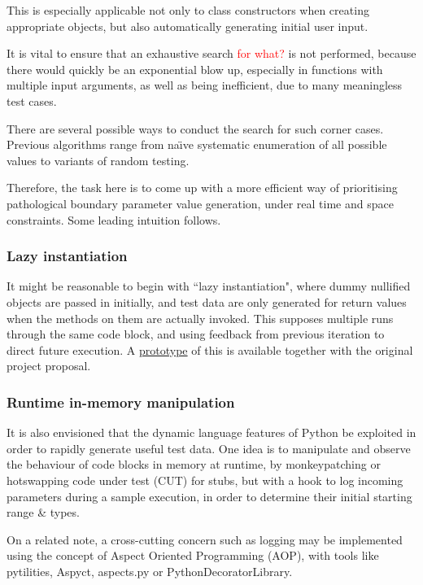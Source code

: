 \documentclass{icldt}
\numberwithin{equation}{section}       %
\def\naive{na\"{\i}ve }
\begin{document}
This is especially applicable not only to class constructors when creating appropriate objects, but also automatically generating initial user input.

It is vital to ensure that an exhaustive search \textcolor{red}{for what?} is not performed, because there would quickly be an exponential blow up, especially in functions with multiple input arguments, as well as being inefficient, due to many meaningless test cases.

There are several possible ways to conduct the search for such corner cases. Previous algorithms range from \naive systematic enumeration of all possible values to variants of random testing.

Therefore, the task here is to come up with a more efficient way of prioritising pathological boundary parameter value generation, under real time and space constraints. Some leading intuition follows.
\subsubsection{Lazy instantiation}
It might be reasonable to begin with ``lazy instantiation"\cite{Allwood2011}, where dummy nullified objects are passed in initially, and test data are only generated for return values when the methods on them are actually invoked. This supposes multiple runs through the same code block, and using feedback from previous iteration to direct future execution. A \href{https://github.com/evandrix/Pyrulan}{prototype} of this is available together with the original project proposal.

\subsubsection{Runtime in-memory manipulation}
It is also envisioned that the dynamic language features of Python be exploited in order to rapidly generate useful test data. One idea is to manipulate and observe the behaviour of code blocks in memory at runtime, by monkeypatching or hotswapping code under test (CUT) for stubs, but with a hook to log incoming parameters during a sample execution, in order to determine their initial starting range \& types.

On a related note, a cross-cutting concern such as logging may be implemented using the concept of Aspect Oriented Programming (AOP), with tools like pytilities, Aspyct, aspects.py or PythonDecoratorLibrary.
\end{document}

